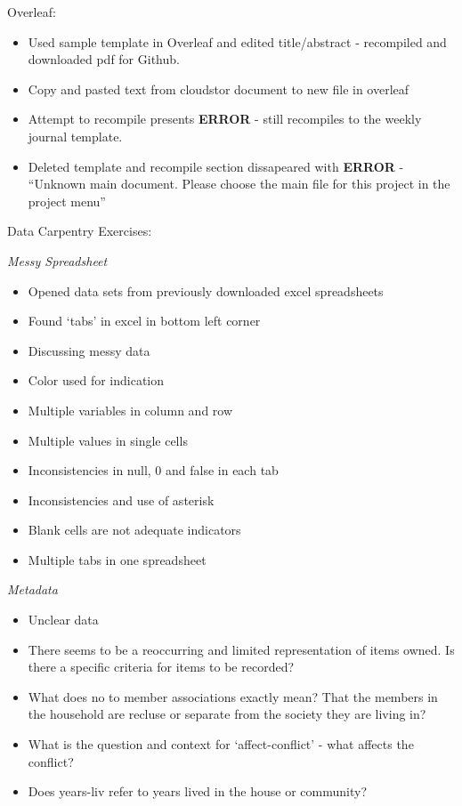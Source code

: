 \documentclass{article}
\begin{document}
Overleaf:
\begin{itemize}
\item Used sample template in Overleaf and edited title/abstract - recompiled and downloaded pdf for Github.
\item Copy and pasted text from cloudstor document to new file in overleaf
\item Attempt to recompile presents \textbf{ERROR} - still recompiles to the weekly journal template. 
\item Deleted template and recompile section dissapeared with \textbf{ERROR} - “Unknown main document. Please choose the main file for this project in the project menu”
\end{itemize}

Data Carpentry Exercises:

\textit{Messy Spreadsheet}

\begin{itemize}
\item Opened data sets from previously downloaded excel spreadsheets
\item Found ‘tabs’ in excel in bottom left corner
\item Discussing messy data
\item Color used for indication
\item Multiple variables in column and row
\item Multiple values in single cells
\item Inconsistencies in null, 0 and false in each tab
\item Inconsistencies and use of asterisk
\item Blank cells are not adequate indicators
\item Multiple tabs in one spreadsheet
\end{itemize}

\textit{Metadata }


\begin{itemize}
\item Unclear data
\item There seems to be a reoccurring and limited representation of items owned. Is there a specific criteria for items to be recorded?
\item What does no to member associations exactly mean? That the members in the household are recluse or separate from the society they are living in?
\item What is the question and context for ‘affect-conflict’ - what affects the conflict?
\item Does years-liv refer to years lived in the house or community?
\end{itemize}
\end{document}
